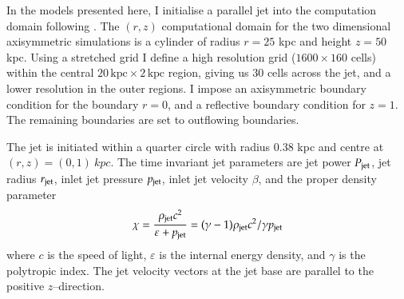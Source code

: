 
In the models presented here, I initialise a parallel jet into the computation domain following \citet{sutherland07, wagner11}.  The $(r, z)$ computational domain for the two dimensional axisymmetric simulations is a cylinder of radius $r=25$ kpc and height $z=50$ kpc. Using a stretched grid I define a high resolution grid ($1600 \times 160$ cells) within the central $20\,\mathrm{kpc}\times2\,\mathrm{kpc}$ region, giving us 30 cells across the jet, and a lower resolution in the outer regions. I impose an axisymmetric boundary condition for the boundary $r=0$, and a reflective boundary condition for $z=1$.  The remaining boundaries are set to outflowing boundaries.

The jet is initiated within a quarter circle with radius 0.38 kpc and centre at $(r, z) = (0, 1)~kpc$. The time invariant jet parameters are jet power $P_{\rm{jet}}$, jet radius $r_{\rm{jet}}$, inlet jet pressure $p_{\rm{jet}}$, inlet jet velocity $\beta$, and the proper density parameter 
\begin{equation}
\chi =  \frac{\rho_{\rm jet} c^2}{\varepsilon + p_{\rm jet}} = (\gamma -1)\rho_{\rm{jet}}c^2/\gamma p_{\rm{jet}}
\end{equation}
where $c$ is the speed of light, $\varepsilon$ is the internal energy density, and $\gamma$ is the polytropic index. The jet velocity vectors at the jet base are parallel to the positive $z$--direction.



